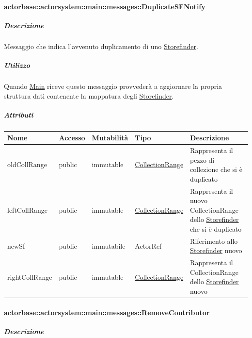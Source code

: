 \documentclass{scalatekids-article}
\begin{document}
\paragraph{actorbase::actorsystem::main::messages::DuplicateSFNotify}
\label{sec:actorbase::actorsystem::main::messages::DuplicateSFNotify}

\subparagraph{Descrizione}

Messaggio che indica l'avvenuto duplicamento di uno \hyperref[sec:actorbase::actorsystem::storefinder::Storefinder]{Storefinder}.

\subparagraph{Utilizzo}
Quando \hyperref[sec:actorbase::actorsystem::main::Main]{Main}
riceve questo messaggio provvederà a aggiornare la propria struttura dati
contenente la mappatura degli \hyperref[sec:actorbase::actorsystem::storefinder::Storefinder]{Storefinder}.

\subparagraph{Attributi}
\begin{tabular}{| p{3cm} | p{1.5cm} | p{2cm} | p{2cm} | p{8.5cm} |}
  \hline
  Nome & Accesso & Mutabilità & Tipo & Descrizione\\
  \hline
  oldCollRange & public & immutable & \hyperref[sec:actorbase::actorsystem::utils::CollectionRange]{CollectionRange} & Rappresenta il pezzo di collezione che si è duplicato\\
  \hline
  leftCollRange & public & immutable & \hyperref[sec:actorbase::actorsystem::utils::CollectionRange]{CollectionRange} & Rappresenta il nuovo CollectionRange dello \hyperref[sec:actorbase::actorsystem::storefinder::Storefinder]{Storefinder} che si è duplicato\\
  \hline
  newSf & public & immutabile & ActorRef & Riferimento allo \hyperref[sec:actorbase::actorsystem::storefinder::Storefinder]{Storefinder} nuovo\\
  \hline
  rightCollRange & public & immutable & \hyperref[sec:actorbase::actorsystem::utils::CollectionRange]{CollectionRange} & Rappresenta il CollectionRange dello \hyperref[sec:actorbase::actorsystem::storefinder::Storefinder]{Storefinder} nuovo\\
  \hline
\end{tabular}

\paragraph{actorbase::actorsystem::main::messages::RemoveContributor}
\label{sec:actorbase::actorsystem::main::messages::RemoveContributor}

\subparagraph{Descrizione}
\end{document}
